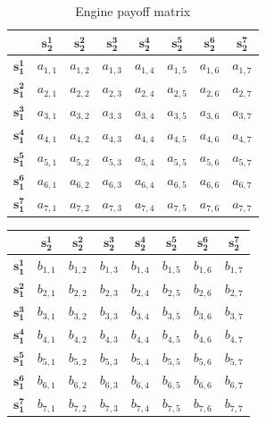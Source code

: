 {\renewcommand{\arraystretch}{1.5}
\begin{table}[h]
\centering 
\begin{tabular}{ |c|c|c|c|c|c|c|c| } 
\hline
      & $\mathbf{s_2^1}$ & $\mathbf{s_2^2}$ & $\mathbf{s_2^3}$ & $\mathbf{s_2^4}$ & $\mathbf{s_2^5}$ & $\mathbf{s_2^6}$ & $\mathbf{s_2^7}$ \\ \hline 
 $\mathbf{s_1^1}$ & $a_{1,1}$ & $a_{1,2}$ & $a_{1,3}$ & $a_{1,4}$ & $a_{1,5}$ & $a_{1,6}$ & $a_{1,7}$  \\ \hline
 $\mathbf{s_1^2}$ & $a_{2,1}$ & $a_{2,2}$ & $a_{2,3}$ & $a_{2,4}$ & $a_{2,5}$ & $a_{2,6}$ & $a_{2,7}$  \\ \hline
 $\mathbf{s_1^3}$ & $a_{3,1}$ & $a_{3,2}$ & $a_{3,3}$ & $a_{3,4}$ & $a_{3,5}$ & $a_{3,6}$ & $a_{3,7}$  \\ \hline
 $\mathbf{s_1^4}$ & $a_{4,1}$ & $a_{4,2}$ & $a_{4,3}$ & $a_{4,4}$ & $a_{4,5}$ & $a_{4,6}$ & $a_{4,7}$  \\ \hline
 $\mathbf{s_1^5}$ & $a_{5,1}$ & $a_{5,2}$ & $a_{5,3}$ & $a_{5,4}$ & $a_{5,5}$ & $a_{5,6}$ & $a_{5,7}$  \\ \hline
 $\mathbf{s_1^6}$ & $a_{6,1}$ & $a_{6,2}$ & $a_{6,3}$ & $a_{6,4}$ & $a_{6,5}$ & $a_{6,6}$ & $a_{6,7}$  \\ \hline
 $\mathbf{s_1^7}$ & $a_{7,1}$ & $a_{7,2}$ & $a_{7,3}$ & $a_{7,4}$ & $a_{7,5}$ & $a_{7,6}$ & $a_{7,7}$  \\ \hline
\end{tabular}
\caption{Engine payoff matrix}
\label{tab:payoffEngine}
\end{table}

\begin{table}[h]
\centering 
\begin{tabular}{ |c|c|c|c|c|c|c|c| } 
\hline
      & $\mathbf{s_2^1}$ & $\mathbf{s_2^2}$ & $\mathbf{s_2^3}$ & $\mathbf{s_2^4}$ & $\mathbf{s_2^5}$ & $\mathbf{s_2^6}$ & $\mathbf{s_2^7}$ \\ \hline
 $\mathbf{s_1^1}$ & $b_{1,1}$ & $b_{1,2}$ & $b_{1,3}$ & $b_{1,4}$ & $b_{1,5}$ & $b_{1,6}$ & $b_{1,7}$  \\ \hline
 $\mathbf{s_1^2}$ & $b_{2,1}$ & $b_{2,2}$ & $b_{2,3}$ & $b_{2,4}$ & $b_{2,5}$ & $b_{2,6}$ & $b_{2,7}$  \\ \hline
 $\mathbf{s_1^3}$ & $b_{3,1}$ & $b_{3,2}$ & $b_{3,3}$ & $b_{3,4}$ & $b_{3,5}$ & $b_{3,6}$ & $b_{3,7}$  \\ \hline
 $\mathbf{s_1^4}$ & $b_{4,1}$ & $b_{4,2}$ & $b_{4,3}$ & $b_{4,4}$ & $b_{4,5}$ & $b_{4,6}$ & $b_{4,7}$  \\ \hline
 $\mathbf{s_1^5}$ & $b_{5,1}$ & $b_{5,2}$ & $b_{5,3}$ & $b_{5,4}$ & $b_{5,5}$ & $b_{5,6}$ & $b_{5,7}$  \\ \hline
 $\mathbf{s_1^6}$ & $b_{6,1}$ & $b_{6,2}$ & $b_{6,3}$ & $b_{6,4}$ & $b_{6,5}$ & $b_{6,6}$ & $b_{6,7}$  \\ \hline
 $\mathbf{s_1^7}$ & $b_{7,1}$ & $b_{7,2}$ & $b_{7,3}$ & $b_{7,4}$ & $b_{7,5}$ & $b_{7,6}$ & $b_{7,7}$  \\ \hline


\end{tabular}
\end{table}}
